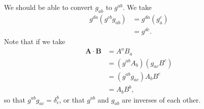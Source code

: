 \documentclass[10pt]{mypackage}
\begin{document}
  We should be able to convert $g_{ab}$ to $g^{ab}$. We take
  \begin{align*}
    g^{da}\left( g^{cb}g_{ab} \right) &= g^{da}\left( g_{a}^{c} \right)\\
                                      &= g^{dc}.
  \end{align*}
  Note that if we take
  \begin{align*}
    \mathbf{A}\cdot \mathbf{B} &= A^aB_a\\
                               &= \left( g^{ab}A_{b} \right)\left( g_{ac}B^{c} \right)\\
                               &= \left( g^{ab}g_{ac} \right)A_bB^{c}\\
                               &= A_bB^{b},
  \end{align*}
  so that $g^{ab}g_{ac} = \delta^{b}_{c}$, or that $g^{ab}$ and $g_{ab}$ are inverses of each other.
\end{document}
